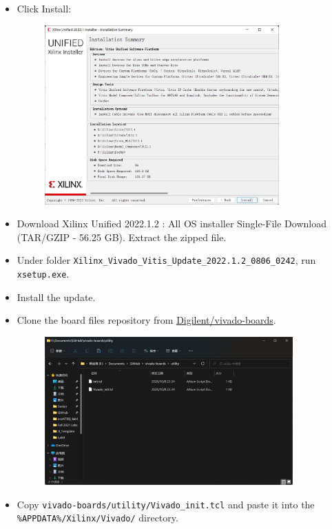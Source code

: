 \documentclass[a4paper,12pt,twoside]{article}
\begin{document}
\begin{itemize}
\begin{figure}[H]
    \end{figure}
    \item Click Install:
    \begin{figure}[H]
        \centering
        \includegraphics[width=0.85\textwidth]{6.png}
    \end{figure}
    \item Download Xilinx Unified 2022.1.2 : All OS installer Single-File Download (TAR/GZIP - 56.25 GB). Extract the zipped file.
    \item Under folder \texttt{Xilinx\_Vivado\_Vitis\_Update\_2022.1.2\_0806\_0242}, run \texttt{xsetup.exe}.
    \item Install the update.
    \item Clone the board files repository from \href{https://github.com/Digilent/vivado-boards}{Digilent/vivado-boards}.
    \begin{figure}[H]
        \centering
        \includegraphics[width=0.9\textwidth]{7.png}
    \end{figure}
    \item Copy \texttt{vivado-boards/utility/Vivado\_init.tcl} and paste it into the\\ \texttt{\%APPDATA\%/Xilinx/Vivado/} directory.

\end{itemize}
\end{document}
